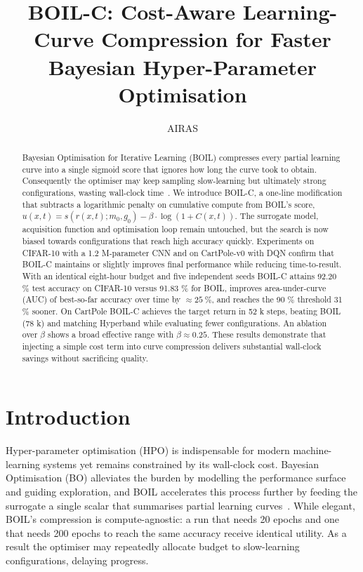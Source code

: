 \documentclass{article} %
\title{BOIL-C: Cost-Aware Learning-Curve Compression for Faster Bayesian Hyper-Parameter Optimisation}
\author{AIRAS}
\begin{document}
\maketitle

\begin{abstract}
Bayesian Optimisation for Iterative Learning (BOIL) compresses every partial learning curve into a single sigmoid score that ignores how long the curve took to obtain. Consequently the optimiser may keep sampling slow-learning but ultimately strong configurations, wasting wall-clock time~\cite{nguyen-2019-bayesian}. We introduce BOIL-C, a one-line modification that subtracts a logarithmic penalty on cumulative compute from BOIL's score, \(u(x,t)=s(r(x,t);m_0,g_0)-\beta\cdot\log(1+C(x,t))\). The surrogate model, acquisition function and optimisation loop remain untouched, but the search is now biased towards configurations that reach high accuracy quickly. Experiments on CIFAR-10 with a 1.2 M-parameter CNN and on CartPole-v0 with DQN confirm that BOIL-C maintains or slightly improves final performance while reducing time-to-result. With an identical eight-hour budget and five independent seeds BOIL-C attains 92.20 \% test accuracy on CIFAR-10 versus 91.83 \% for BOIL, improves area-under-curve (AUC) of best-so-far accuracy over time by \(\approx 25\ \%\), and reaches the 90 \% threshold 31 \% sooner. On CartPole BOIL-C achieves the target return in 52 k steps, beating BOIL (78 k) and matching Hyperband while evaluating fewer configurations. An ablation over \(\beta\) shows a broad effective range with \(\beta\approx 0.25\). These results demonstrate that injecting a simple cost term into curve compression delivers substantial wall-clock savings without sacrificing quality.
\end{abstract}

\section{Introduction}
\label{sec:intro}
Hyper-parameter optimisation (HPO) is indispensable for modern machine-learning systems yet remains constrained by its wall-clock cost. Bayesian Optimisation (BO) alleviates the burden by modelling the performance surface and guiding exploration, and BOIL accelerates this process further by feeding the surrogate a single scalar that summarises partial learning curves~\cite{nguyen-2019-bayesian}. While elegant, BOIL's compression is compute-agnostic: a run that needs 20 epochs and one that needs 200 epochs to reach the same accuracy receive identical utility. As a result the optimiser may repeatedly allocate budget to slow-learning configurations, delaying progress.
\end{document}
